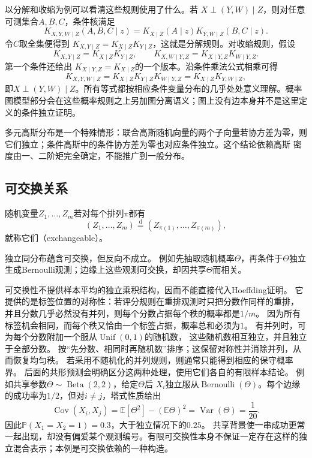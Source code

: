 以分解和收缩为例可以看清这些规则使用了什么。若
\(X\perp(Y,W)\mid Z\)，则对任意可测集合\(A,B,C\)，条件核满足
\[
  K_{X,Y,W\mid Z}(A,B,C\mid z)
  =K_{X\mid Z}(A\mid z)K_{Y,W\mid Z}(B,C\mid z).
\]
令\(C\)取全集便得到
\(K_{X,Y\mid Z}=K_{X\mid Z}K_{Y\mid Z}\)，这就是分解规则。对收缩规则，假设
\[
  K_{X,Y\mid Z}=K_{X\mid Z}K_{Y\mid Z},
  \qquad
  K_{X,W\mid Y,Z}=K_{X\mid Y,Z}K_{W\mid Y,Z}.
\]
第一个条件还给出
\(K_{X\mid Y,Z}=K_{X\mid Z}\)的一个版本。沿条件乘法公式相乘可得
\[
  K_{X,Y,W\mid Z}
  =K_{X\mid Z}K_{Y\mid Z}K_{W\mid Y,Z}
  =K_{X\mid Z}K_{Y,W\mid Z},
\]
即\(X\perp(Y,W)\mid Z\)。所有等式都按相应条件变量分布的几乎处处意义理解。概率图模型部分会在这些概率规则之上另加图分离语义；图上没有边本身并不是这里定义的条件独立证明。

多元高斯分布是一个特殊情形：联合高斯随机向量的两个子向量若协方差为零，则它们独立；条件高斯中的条件协方差为零也对应条件独立。这个结论依赖高斯
密度由一、二阶矩完全确定，不能推广到一般分布。

\subsection{可交换关系}
\label{sec:rv-exchangeability}
\begin{definition}[可交换随机变量]
  \label{def:probability-exchangeability}
随机变量\(Z_1,\ldots,Z_m\)若对每个排列\(\pi\)都有
\[ (Z_1,\ldots,Z_m)
  \overset{\mathrm{d}}{=}(Z_{\pi(1)},\ldots,Z_{\pi(m)}), \]
就称它们（exchangeable）。
\end{definition}
独立同分布蕴含可交换，但反向不成立。
例如先抽取随机概率\(\Theta\)，再条件于\(\Theta\)独立生成Bernoulli观测；边缘上这些观测可交换，却因共享\(\Theta\)而相关。

可交换性不提供样本平均的独立乘积结构，因而不能直接代入Hoeffding证明。
它提供的是标签位置的对称性：若评分规则在重排观测时只把分数作同样的重排，
并且分数几乎必然没有并列，则每个分数占据每个秩的概率都是\(1/m\)。
因为所有标签机会相同，而每个秩又恰由一个标签占据，概率总和必须为\(1\)。
有并列时，可为每个分数附加一个服从\(\operatorname{Unif}(0,1)\)的随机数，
这些随机数相互独立，并且独立于全部分数。
按“先分数、相同时再随机数”排序；这保留对称性并消除并列，从而恢复均匀秩。
若采用不随机化的并列规则，则通常只能得到相应的保守概率界。
后面的共形预测会明确区分这两种处理，使用它们各自的有限样本结论。
例如共享参数\(\Theta\sim\operatorname{Beta}(2,2)\)，给定\(\Theta\)后
\(X_i\)独立服从\(\operatorname{Bernoulli}(\Theta)\)。每个边缘的成功率为\(1/2\)，但对\(i\ne j\)，塔式性质给出
\[
\operatorname{Cov}(X_i,X_j)
=\mathbb E[\Theta^2]-(\mathbb E\Theta)^2
=\operatorname{Var}(\Theta)=\frac1{20}.
\]
因此\(\mathbb P(X_1=X_2=1)=0.3\)，大于独立情况下的\(0.25\)。
共享背景使一串成功更常一起出现，却没有偏爱某个观测编号。有限可交换性本身不保证一定存在这样的独立混合表示；本例是可交换依赖的一种构造。

